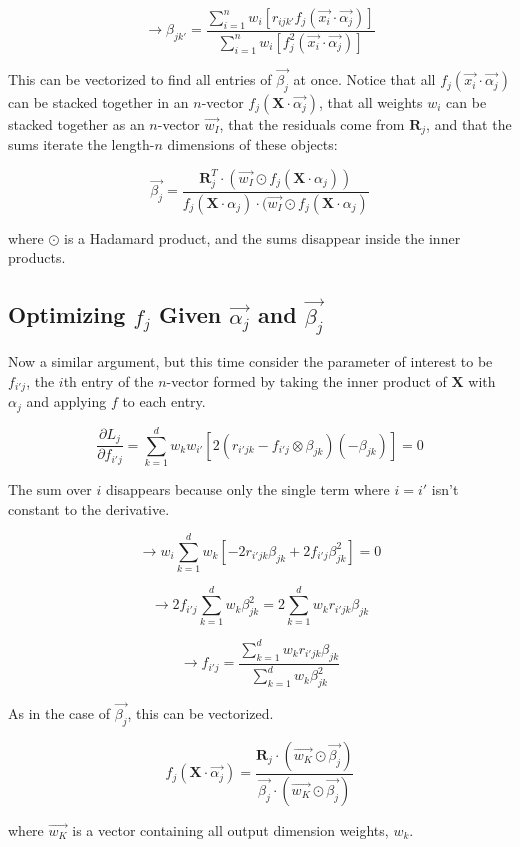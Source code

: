 \documentclass[12pt]{article}
\begin{document}
$$\rightarrow \beta_{jk'} = \frac{\sum_{i=1}^n w_i [r_{ijk'} f_j(\vec{x_i} \cdot \vec{\alpha_j})]}{\sum_{i=1}^n w_i [f_j^2(\vec{x_i} \cdot \vec{\alpha_j})]}$$

This can be vectorized to find all entries of $\vec{\beta_j}$ at once. Notice that all $f_j(\vec{x_i} \cdot \vec{\alpha_j})$ can be stacked together in an $n$-vector $f_j(\pmb{X} \cdot \vec{\alpha_j})$, that all weights $w_i$ can be stacked together as an $n$-vector $\vec{w_I}$, that the residuals come from $\pmb{R}_j$, and that the sums iterate the length-$n$ dimensions of these objects:

$$ \vec{\beta_j} = \frac{\pmb{R}_j^T \cdot (\vec{w_I} \odot f_j(\pmb{X} \cdot \alpha_j))}{f_j(\pmb{X} \cdot \alpha_j) \cdot (\vec{w_I} \odot f_j(\pmb{X} \cdot \alpha_j)}$$

where $\odot$ is a Hadamard product, and the sums disappear inside the inner products.

\subsection{Optimizing $f_j$ Given $\vec{\alpha_j}$ and $\vec{\beta_j}$}

Now a similar argument, but this time consider the parameter of interest to be $f_{i'j}$, the $i$th entry of the $n$-vector formed by taking the inner product of $\pmb{X}$ with $\alpha_j$ and applying $f$ to each entry.


$$\frac{\partial L_j}{\partial f_{i'j}} = \sum_{k=1}^d w_k w_{i'} [2(r_{i'jk} - f_{i'j} \otimes \beta_{jk})(-\beta_{jk})] = 0$$

The sum over $i$ disappears because only the single term where $i=i'$ isn't constant to the derivative.

$$\rightarrow w_i \sum_{k=1}^d w_k [-2 r_{i'jk} \beta_{jk} + 2 f_{i'j} \beta_{jk}^2 ] = 0$$

$$\rightarrow 2 f_{i'j} \sum_{k=1}^d w_k \beta_{jk}^2 = 2 \sum_{k=1}^d w_k r_{i'jk} \beta_{jk}$$

$$\rightarrow f_{i'j} = \frac{\sum_{k=1}^d w_k r_{i'jk} \beta_{jk}}{\sum_{k=1}^d w_k \beta_{jk}^2}$$

As in the case of $\vec{\beta_j}$, this can be vectorized.

$$ f_j(\pmb{X} \cdot \vec{\alpha_j}) = \frac{\pmb{R}_j \cdot (\vec{w_K} \odot \vec{\beta_j})}{\vec{\beta_j} \cdot (\vec{w_K} \odot \vec{\beta_j})}$$

where $\vec{w_K}$ is a vector containing all output dimension weights, $w_k$.\newline
\end{document}
